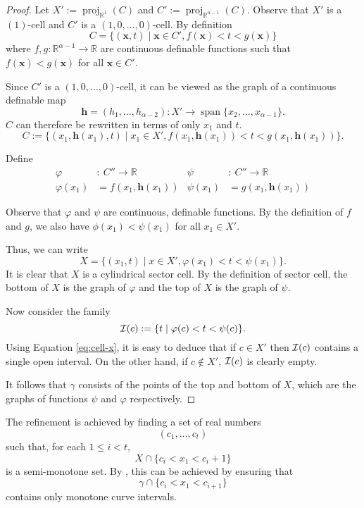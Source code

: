 \documentclass[
]{book}
\theoremstyle{definition}
\theoremstyle{definition}
\theoremstyle{definition}
\theoremstyle{definition}
\theoremstyle{remark}
\begin{document}
\begin{proof}
Let \(X' := {\operatorname{proj}_{\mathbb{R}^{1}}}(C)\) and \(C' := {\operatorname{proj}_{\mathbb{R}^{\alpha-1}}}(C)\).
Observe that \(X'\) is a \((1)\)-cell and \(C'\) is a \((1,0,\ldots,0)\)-cell.
By definition
\[
C = \{ (\mathbf{x},t) \mid \mathbf{x} \in C', f(\mathbf{x}) < t < g(\mathbf{x})\}
\]
where \(f,g : \mathbb{R}^{\alpha - 1} \to \mathbb{R}\) are continuous definable functions such that \(f(\mathbf{x}) < g(\mathbf{x})\) for all \(\mathbf{x} \in C'\).

Since \(C'\) is a \((1,0,\ldots,0)\)-cell, it can be viewed as the graph of a continuous definable map
\[
\mathbf{h} = (h_1,\ldots,h_{\alpha - 2}) : X' \to {\operatorname{span} \{x_2,\ldots,x_{\alpha-1}\}}.
\]
\(C\) can therefore be rewritten in terms of only \(x_1\) and \(t\).
\[
C := \{ (x_1,\mathbf{h}(x_1),t) \mid x_1 \in X', f(x_1,\mathbf{h}(x_1)) < t < g(x_1,\mathbf{h}(x_1))\}.
\]

Define
\begin{align}
\varphi &:\> C'' \to \mathbb{R}& \psi &:\> C'' \to \mathbb{R}\\
\varphi(x_1) &= f(x_1,\mathbf{h}(x_1)) & \psi(x_1) &= g(x_1,\mathbf{h}(x_1))
\label{eq:phi-psi}
\end{align}

Observe that \(\varphi\) and \(\psi\) are continuous, definable functions. By the definition of \(f\) and \(g\), we also have \(\phi(x_1) < \psi(x_1)\) for all \(x_1\in X'\).

Thus, we can write
\begin{equation}
X = \{ (x_1,t) \mid x \in X', \varphi(x_1) < t < \psi(x_1) \}.
\label{eq:cell-x}
\end{equation}
It is clear that \(X\) is a cylindrical sector cell.
By the definition of sector cell, the bottom of \(X\) is the graph of \(\varphi\) and the top of \(X\) is the graph of \(\psi\).

Now consider the family
\[
{\cal I}(c) := \{ t \mid \varphi(c) < t < \psi(c) \}.
\]
Using Equation \eqref{eq:cell-x}, it is easy to deduce that if \(c \in X'\) then \({\cal I}(c)\) contains a single open interval. On the other hand, if \(c \not \in X'\), \({\cal I}(c)\) is clearly empty.

It follows that \(\gamma\) consists of the points of the top and bottom of \(X\), which are the graphs of functions \(\psi\) and \(\varphi\) respectively.
\end{proof}

The refinement is achieved by finding a set of real numbers
\[
(c_1,\ldots,c_t)
\]
such that, for each \(1 \le i < t\),
\[
X \cap \{c_i < x_1 < c_i+1\}
\]
is a semi-monotone set. By \citep[Theorem 1.7]{bgv13}, this can be achieved by ensuring that
\[
\gamma \cap \{ c_i < x_1 < c_{i+1}\}
\]
contains only monotone curve intervals.
\end{document}
